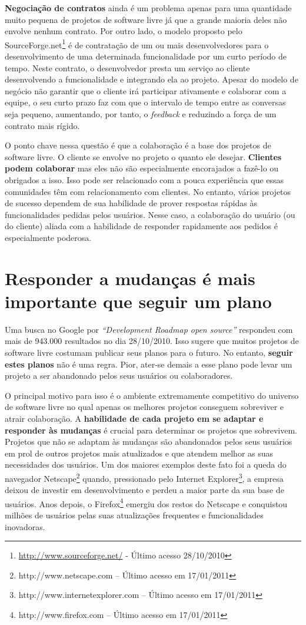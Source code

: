 \textbf{Negociação de contratos} ainda é um problema apenas para uma
quantidade muito pequena de projetos de software livre já que a grande
maioria deles não envolve nenhum contrato.  Por outro lado, o modelo
proposto pelo
SourceForge.net\footnote{\url{http://www.sourceforge.net/} - Último
  acesso 28/10/2010} é de contratação de um ou mais desenvolvedores
para o desenvolvimento de uma determinada funcionalidade por um curto
período de tempo. Neste contrato, o desenvolvedor presta um serviço ao
cliente desenvolvendo a funcionalidade e integrando ela ao
projeto. Apesar do modelo de negócio não garantir que o cliente irá
participar ativamente e colaborar com a equipe, o seu curto prazo faz
com que o intervalo de tempo entre as conversas seja pequeno,
aumentando, por tanto, o \emph{feedback} e reduzindo a força de um
contrato mais rígido.

O ponto chave nessa questão é que a colaboração é a base dos projetos
de software livre.  O cliente se envolve no projeto o quanto ele
desejar. \textbf{Clientes podem colaborar} mas eles não são
especialmente encorajados a fazê-lo ou obrigados a isso. Isso pode ser
relacionado com a pouca experiência que essas comunidades têm com
relacionamento com clientes. No entanto, vários projetos de sucesso
dependem de sua habilidade de prover respostas rápidas às
funcionalidades pedidas pelos usuários. Nesse caso, a colaboração do
usuário (ou do cliente) aliada com a habilidade de responder
rapidamente aos pedidos é especialmente poderosa.

\section{Responder a mudanças é mais importante que seguir um plano}
\label{sec:fourth-princ}

Uma busca no Google por \emph{``Development Roadmap open source''}
respondeu com mais de 943.000 resultados no dia 28/10/2010. Isso
sugere que muitos projetos de software livre costumam publicar seus
planos para o futuro. No entanto, \textbf{seguir estes planos} não é
uma regra. Pior, ater-se demais a esse plano pode levar um projeto a
ser abandonado pelos seus usuários ou colaboradores.

O principal motivo para isso é o ambiente extremamente competitivo do
universo de software livre no qual apenas os melhores projetos
conseguem sobreviver e atrair colaboração. A \textbf{habilidade de
  cada projeto em se adaptar e responder às mudanças} é crucial para
determinar os projetos que sobrevivem.  Projetos que não se adaptam às
mudanças são abandonados pelos seus usuários em prol de outros
projetos mais atualizados e que atendem melhor as suas necessidades
dos usuários.  Um dos maiores exemplos deste fato foi a queda do
navegador Netscape\footnote{http://www.netscape.com -- Último acesso
  em 17/01/2011} quando, pressionado pelo Internet
Explorer\footnote{http://www.internetexplorer.com -- Último acesso em
  17/01/2011}, a empresa deixou de investir em desenvolvimento e
perdeu a maior parte da sua base de usuários. Anos depois, o
Firefox\footnote{http://www.firefox.com -- Último acesso em
  17/01/2011} emergiu dos restos do Netscape e conquistou milhões de
usuários pelas suas atualizações frequentes e funcionalidades
inovadoras.

